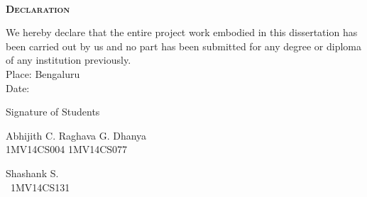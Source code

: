 \begin{titlepage}

\
\begin{center}
\normalfont\LARGE\textbf{\textsc{Declaration}}\\[20pt]
\end{center}
We hereby declare that the entire project work embodied in this dissertation has been carried out by us and no part has been submitted for any degree or diploma of any institution previously.\bigskip\\

\noindent Place: Bengaluru\\
Date:\\
\begin{center}
Signature of Students
\end{center}
\vspace{100px}

\noindent Abhijith C. \hfill Raghava G. Dhanya \hfill\\
 \noindent 1MV14CS004 \hfill 1MV14CS077 \hspace{37pt}\ \\

\vspace{100px}
\begin{center}
Shashank S.\\
\ 1MV14CS131

\end{center}

\end{titlepage}

